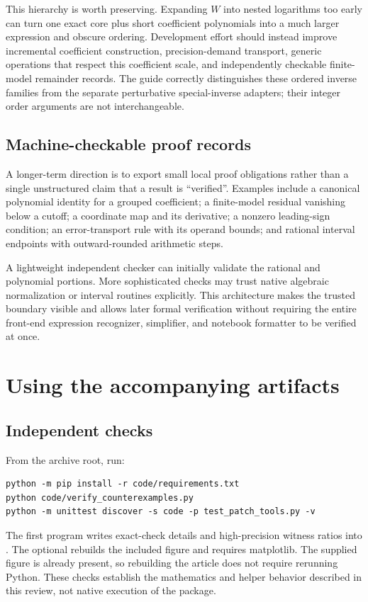 \documentclass[11pt,letterpaper]{article}
\newcommand{\code}[1]{\texttt{\small\detokenize{#1}}}
\begin{document}
This hierarchy is worth preserving. Expanding $W$ into nested logarithms too early can turn one exact core plus short coefficient polynomials into a much larger expression and obscure ordering. Development effort should instead improve incremental coefficient construction, precision-demand transport, generic operations that respect this coefficient scale, and independently checkable finite-model remainder records. The guide correctly distinguishes these ordered inverse families from the separate perturbative special-inverse adapters; their integer order arguments are not interchangeable.\cite{repo-guide,repo-gamma}

\subsection{Machine-checkable proof records}
A longer-term direction is to export small local proof obligations rather than a single unstructured claim that a result is ``verified''. Examples include a canonical polynomial identity for a grouped coefficient; a finite-model residual vanishing below a cutoff; a coordinate map and its derivative; a nonzero leading-sign condition; an error-transport rule with its operand bounds; and rational interval endpoints with outward-rounded arithmetic steps.

A lightweight independent checker can initially validate the rational and polynomial portions. More sophisticated checks may trust native algebraic normalization or interval routines explicitly. This architecture makes the trusted boundary visible and allows later formal verification without requiring the entire front-end expression recognizer, simplifier, and notebook formatter to be verified at once.

\section{Using the accompanying artifacts}
\label{sec:artifacts}
\subsection{Independent checks}
From the archive root, run:
\begin{lstlisting}
python -m pip install -r code/requirements.txt
python code/verify_counterexamples.py
python -m unittest discover -s code -p test_patch_tools.py -v
\end{lstlisting}
The first program writes exact-check details and high-precision witness ratios into \code{results/}. The optional \code{plot_witness.py} rebuilds the included figure and requires matplotlib. The supplied figure is already present, so rebuilding the article does not require rerunning Python. These checks establish the mathematics and helper behavior described in this review, not native execution of the package.
\end{document}
